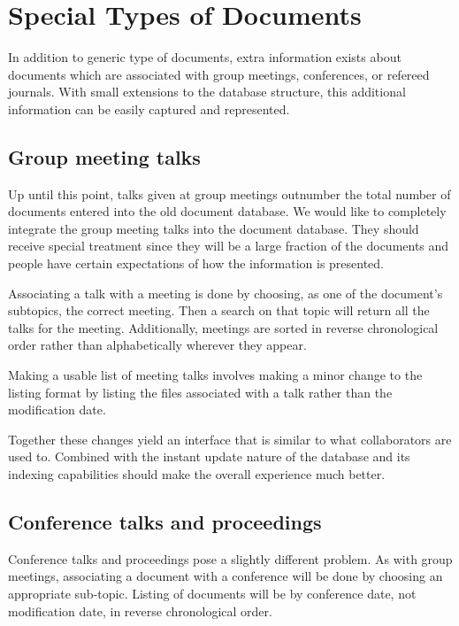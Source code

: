 \documentclass[12pt]{article}
\begin{document}
\section{Special Types of Documents}

In addition to generic type of documents, extra information exists about
documents which are associated with group meetings, conferences, or refereed
journals. With small extensions to the database structure, this additional
information can be easily captured and represented.

\subsection{Group meeting talks}

Up until this point, talks given at group meetings outnumber the total number
of documents entered into the old document database. We would like to
completely integrate the group meeting talks into the document database. They
should receive special treatment since they will be a large fraction of the
documents and people have certain expectations of how the information is
presented.

Associating a talk with a meeting is done by choosing, as one of the document's
subtopics, the correct meeting. Then a search on that topic will return all the
talks for the meeting. Additionally, meetings are sorted in reverse
chronological order rather than alphabetically wherever they appear.

Making a usable list of meeting talks involves making a minor change to the
listing format by listing the files associated with a talk rather than the
modification date. 

Together these changes yield an interface that is similar to what collaborators
are used to. Combined with the instant update nature of the database and its
indexing capabilities should make the overall experience much better.

\subsection{Conference talks and proceedings}

Conference talks and proceedings pose a slightly different problem. As with
group meetings, associating a document with a conference will be done by
choosing an appropriate sub-topic. Listing of documents will be by conference
date, not modification date, in reverse chronological order. 
\end{document}
